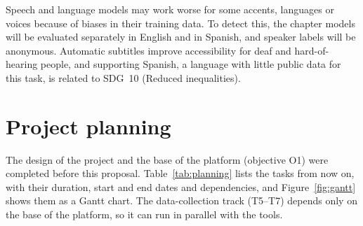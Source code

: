 \documentclass[ENG]{TFUOC}
\begin{document}
Speech and language models may work worse for some accents, languages or voices because of biases in their training data. To detect this, the chapter models will be evaluated separately in English and in Spanish, and speaker labels will be anonymous. Automatic subtitles improve accessibility for deaf and hard-of-hearing people, and supporting Spanish, a language with little public data for this task, is related to SDG~10 (Reduced inequalities).

\section{Project planning}

The design of the project and the base of the platform (objective O1) were completed before this proposal. Table~\ref{tab:planning} lists the tasks from now on, with their duration, start and end dates and dependencies, and Figure~\ref{fig:gantt} shows them as a Gantt chart. The data-collection track (T5--T7) depends only on the base of the platform, so it can run in parallel with the tools.
\end{document}
